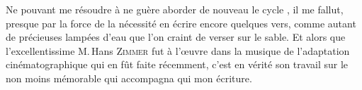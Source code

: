 \begin{prose} 
  Ne pouvant me résoudre à ne guère aborder de nouveau le cycle , il me fallut, presque par la force de la nécessité en écrire encore quelques vers, comme autant de précieuses lampées d’eau que l’on craint de verser sur le sable. Et alors que l’excellentissime M.\,Hans \textsc{Zimmer} fut à l’œuvre dans la musique de l’adaptation cinématographique qui en fût faite récemment, c’est en vérité son travail sur le non moins mémorable  qui accompagna  qui  mon écriture.
\end{prose}

